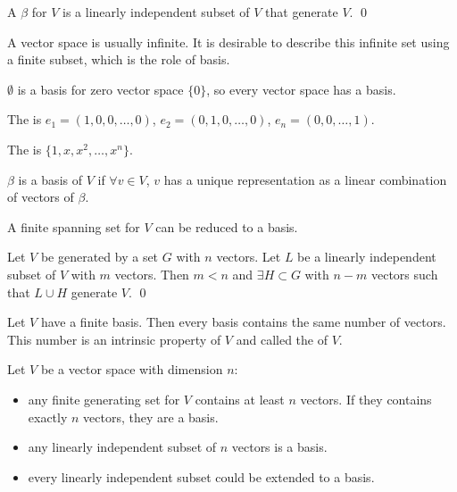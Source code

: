 \begin{definition}
	A  $\beta$ for $V$ is a linearly independent subset of $V$ that generate $V$. 
	\qed
\end{definition}

A vector space is usually infinite. It is desirable to describe this infinite set using a finite subset, which is  the role of basis.

\begin{theorem}
    $\emptyset$ is a basis for zero vector space $\{0\}$, so every vector space has a basis.
\end{theorem}

\begin{definition}
    The  is $e_1=(1,0,0,\dots,0)$, $e_2=(0,1,0,\dots,0)$, $e_n=(0,0,\dots,1)$.
\end{definition}

\begin{definition}
    The  is $\{1,x,x^2,\dots,x^n\}$.
\end{definition}


\begin{theorem}
	$\beta$ is a basis of $V$ if $\forall v \in V $, $v$ has a unique representation as a linear combination of vectors of $\beta$.
\end{theorem}

\begin{theorem}
    A finite spanning set for $V$ can be reduced to a basis.    
\end{theorem}


\begin{theorem}
	Let $V$ be generated by a set $G$ with $n$ vectors. Let $L$ be a linearly independent subset of $V$ with $m$ vectors. Then $m < n$ and $\exists H \subset G$ with $n-m$ vectors such that $L \cup H$ generate $V$.
	\qed
\end{theorem}

\begin{theorem}
    Let $V$ have a finite basis. Then every basis contains the same number of vectors. This number is an intrinsic property of $V$ and called the  of $V$.    
\end{theorem}

\begin{theorem}
    Let $V$ be a vector space with dimension $n$:
    \begin{itemize}
        \item any finite generating set for $V$ contains at least $n$ vectors. If they contains exactly $n$ vectors, they are a basis.
        \item any linearly independent subset of $n$ vectors is a basis.
        \item every linearly independent subset could be extended to a basis.
    \end{itemize}    
\end{theorem}




